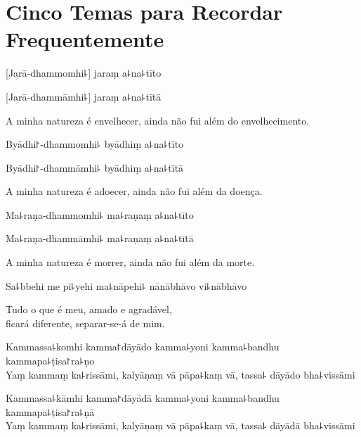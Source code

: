 \documentclass[
  babelLanguage=english,
  final,
  webversion,
]{chantingbook}
\begin{document}
\chapter[Cinco Temas]{Cinco Temas para Recordar Frequentemente}


\begin{leader}
\end{leader}

%
[Jarā-dhammomhi꜕] jaraṃ a꜕na꜕tīto

%
[Jarā-dhammāmhi꜕] jaraṃ a꜕na꜕tītā

\begin{english}
  A minha natureza é envelhecer, ainda não fui além do envelhecimento.
\end{english}

%
Byādhi꜓-dhammomhi꜕ byādhiṃ a꜕na꜕tīto

%
Byādhi꜓-dhammāmhi꜕ byādhiṃ a꜕na꜕tītā

\begin{english}
  A minha natureza é adoecer, ainda não fui além da doença.
\end{english}

%
Ma꜕raṇa-dhammomhi꜕ ma꜕raṇaṃ a꜕na꜕tīto

%
Ma꜕raṇa-dhammāmhi꜕ ma꜕raṇaṃ a꜕na꜕tītā

\begin{english}
  A minha natureza é morrer, ainda não fui além da morte.
\end{english}

Sa꜕bbehi me pi꜕yehi ma꜕nāpehi꜕ nānābhāvo vi꜕nābhāvo

\begin{english}
  Tudo o que é meu, amado e agradável,\\
  ficará diferente, separar-se-á de mim.
\end{english}

%
Kammassa꜕komhi kamma꜓dāyādo kamma꜕yoni kamma꜕bandhu kammapa꜕ṭisa꜓ra꜕ṇo\\
Yaṃ kammaṃ ka꜕rissāmi, kalyāṇaṃ vā pāpa꜕kaṃ vā, tassa꜕ dāyādo bha꜕vissāmi

\clearpage

%
Kammassa꜕kāmhi kamma꜓dāyādā kamma꜕yoni kamma꜕bandhu kammapa꜕ṭisa꜓ra꜕ṇā\\
Yaṃ kammaṃ ka꜕rissāmi, kalyāṇaṃ vā pāpa꜕kaṃ vā, tassa꜕ dāyādā bha꜕vissāmi
\end{document}
